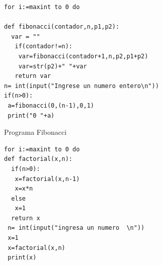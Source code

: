 \documentclass[11pt]{article} %
\begin{document}
\begin{lstlisting}[frame=single]  % Start your code-block
for i:=maxint to 0 do

def fibonacci(contador,n,p1,p2):
  var = ""
   if(contador!=n):
   	var=fibonacci(contador+1,n,p2,p1+p2)
   	var=str(p2)+" "+var
   return var
n= int(input("Ingrese un numero entero\n"))
if(n>0):
 a=fibonacci(0,(n-1),0,1)
 print("0 "+a)  
\end{lstlisting}


\newpage
 Programa Fibonacci

\begin{lstlisting}[frame=single]  % Start your code-block
for i:=maxint to 0 do
def factorial(x,n):
  if(n>0):
   x=factorial(x,n-1)
   x=x*n
  else
   x=1
  return x
 n= int(input("ingresa un numero  \n"))
 x=1
 x=factorial(x,n)
 print(x)
\end{lstlisting}
\end{document}
